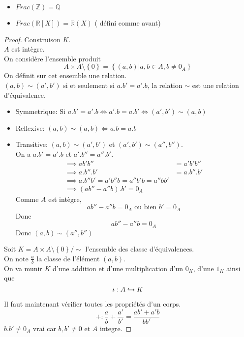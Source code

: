 \documentclass[../main.tex]{subfiles}
\begin{document}
\begin{exemple}
\begin{itemize}
\item $Frac(\mathbb{Z}) = \mathbb{Q}$	
\item $Frac( \mathbb{R}[X]) = \mathbb{R}(X)$ ( défini comme avant)
\end{itemize}
\end{exemple}
\begin{proof}
Construison $K$.\\
$A$ est intègre.\\
On considère l'ensemble produit
\[ 
A \times A \setminus \left\{ 0 \right\} = \left\{ ( a,b) | a,b \in A, b \neq 0_A \right\} 
\]
On définit sur cet ensemble une relation.\\
$ ( a,b) \sim ( a',b')$ si et seulement si $a.b' = a'.b$, la relation  $\sim$ est une relation d'équivalence.
\begin{itemize}
\item Symmetrique: Si $a.b'= a'.b \iff a'.b = a.b' \iff ( a',b')\sim ( a,b)$
\item Reflexive: $ ( a,b) \sim ( a,b) \iff a.b = a.b$ 
	\item Transitive: $(a,b) \sim ( a',b')$ et $(a',b') \sim ( a'', b'')$.\\
		On a $a.b' = a'.b$ et $a'.b'' = a''.b'$.
		\begin{align*}
			\implies ab'b'' &= a'b'b''\\
		\implies a.b''.b' &= a.b''.b'\\
		\implies a.b''b' = a'b''b = a''b'b = a''bb'\\
		\implies ( ab'' -a''b ). b' = 0_A
		\end{align*}
		Comme $A$ est intègre,
		\[ 
		ab'' - a''b = 0_A \text{ ou bien } b'= 0_A
		\]
		Donc 
		\[ 
	ab'' - a''b = 0_A	
		\]
		Donc $ ( a,b) \sim ( a'', b'')$
\end{itemize}
Soit $K = A \times A\setminus \left\{ 0 \right\} / \sim$ l'ensemble des classe d'équivalences.\\
On note $\frac{a}{b}$ la classe de l'élément $(a,b)$.\\
On va munir $K$ d'une addition et d'une multiplication d'un $0_K$, d'une $1_K$ ainsi que 
\[ 
\iota: A \hookrightarrow K
\]

Il faut maintenant vérifier toutes les propriétés d'un corps.
\[ 
+: \frac{a}{b} + \frac{a'}{b'}  = \frac{ab' + a'b}{bb'}
\]
$b.b'\neq 0_A$ vrai car $b,b' \neq 0$ et $A$ integre.


\end{proof}
\end{document}
